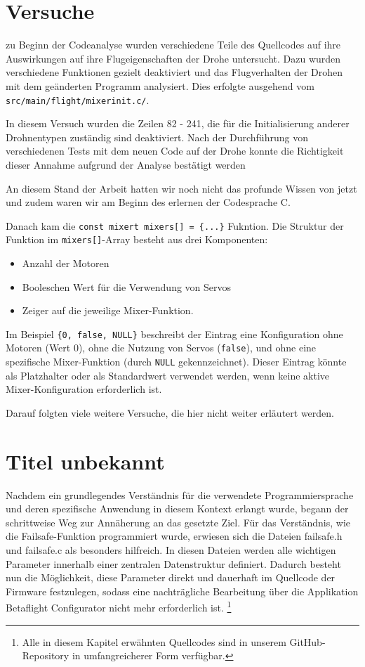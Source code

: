\section{Versuche}\label{sec:tests}
zu Beginn der Codeanalyse wurden verschiedene Teile des Quellcodes auf ihre Auswirkungen auf ihre Flugeigenschaften der Drohe untersucht. Dazu wurden verschiedene Funktionen gezielt deaktiviert und das Flugverhalten der Drohen mit dem geänderten Programm analysiert. Dies erfolgte ausgehend vom \texttt{src/main/flight/mixer\textunderscore init.c/}. 

In diesem Versuch wurden die Zeilen 82 - 241, die für die Initialisierung anderer Drohnentypen zuständig sind deaktiviert. Nach der Durchführung von verschiedenen Tests mit dem neuen Code auf der Drohe konnte die Richtigkeit dieser Annahme aufgrund der Analyse bestätigt werden

An diesem Stand der Arbeit hatten wir noch nicht das profunde Wissen von jetzt und zudem waren wir am Beginn des erlernen der Codesprache C. 

Danach kam die \texttt{const mixer\textunderscore t mixers[] = \{...\}} Fukntion. Die Struktur der Funktion im \texttt{mixers[]}-Array besteht aus drei Komponenten:
\begin{itemize}
\item 
Anzahl der Motoren
\item  
Booleschen Wert\cite{boolsch} für die Verwendung von Servos 
\item  
Zeiger auf die jeweilige Mixer-Funktion. 
\end{itemize}
Im Beispiel \texttt{\{0, false, NULL\}} beschreibt der Eintrag eine Konfiguration ohne Motoren (Wert 0), ohne die Nutzung von Servos (\texttt{false}), und ohne eine spezifische Mixer-Funktion (durch \texttt{NULL} gekennzeichnet). Dieser Eintrag könnte als Platzhalter oder als Standardwert verwendet werden, wenn keine aktive Mixer-Konfiguration erforderlich ist. 

Darauf folgten viele weitere Versuche, die hier nicht weiter erläutert werden.

\section{Titel unbekannt}
Nachdem ein grundlegendes Verständnis für die verwendete Programmiersprache und deren spezifische Anwendung in diesem Kontext erlangt wurde, begann der schrittweise Weg zur Annäherung an das gesetzte Ziel. Für das Verständnis, wie die Failsafe-Funktion programmiert wurde, erwiesen sich die Dateien failsafe.h und failsafe.c als besonders hilfreich. In diesen Dateien werden alle wichtigen Parameter innerhalb einer zentralen Datenstruktur definiert. Dadurch besteht nun die Möglichkeit, diese Parameter direkt und dauerhaft im Quellcode der Firmware festzulegen, sodass eine nachträgliche Bearbeitung über die Applikation Betaflight Configurator nicht mehr erforderlich ist. \footnote{Alle in diesem Kapitel erwähnten Quellcodes sind in unserem GitHub-Repository in umfangreicherer Form verfügbar.\cite{GitHub}} 



